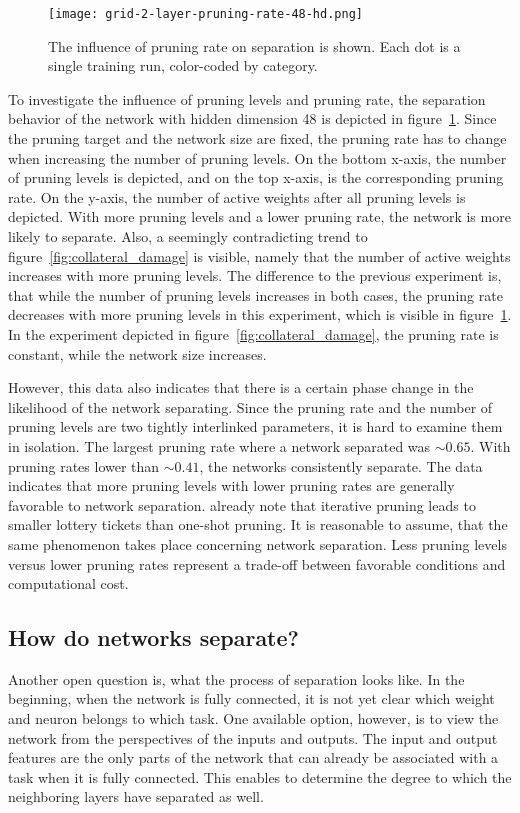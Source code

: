 \begin{figure}[ht] %
    \centering
    \texttt{[image: grid-2-layer-pruning-rate-48-hd.png]}
    \caption[Influence of pruning rate on separation]{
        The influence of pruning rate on separation is shown.
        Each dot is a single training run, color-coded by category.
    }\label{fig:grid-2}
\end{figure}

To investigate the influence of pruning levels and pruning rate, the separation behavior of the network with hidden dimension 48 is depicted in figure~\ref{fig:grid-2}.
Since the pruning target and the network size are fixed, the pruning rate has to change when increasing the number of pruning levels.
On the bottom x-axis, the number of pruning levels is depicted, and on the top x-axis, is the corresponding pruning rate.
On the y-axis, the number of active weights after all pruning levels is depicted.
With more pruning levels and a lower pruning rate, the network is more likely to separate.
Also, a seemingly contradicting trend to figure~\ref{fig:collateral_damage} is visible, namely that the number of active weights increases with more pruning levels.
The difference to the previous experiment is, that while the number of pruning levels increases in both cases, the pruning rate decreases with more pruning levels in this experiment, which is visible in figure~\ref{fig:grid-2}. In the experiment depicted in figure~\ref{fig:collateral_damage}, the pruning rate is constant, while the network size increases.

However, this data also indicates that there is a certain phase change in the likelihood of the network separating.
Since the pruning rate and the number of pruning levels are two tightly interlinked parameters, it is hard to examine them in isolation.
The largest pruning rate where a network separated was $\sim0.65$. 
With pruning rates lower than $\sim0.41$, the networks consistently separate.
The data indicates that more pruning levels with lower pruning rates are generally favorable to network separation.
\textcite{LTH} already note that iterative pruning leads to smaller lottery tickets than one-shot pruning.
It is reasonable to assume, that the same phenomenon takes place concerning network separation.
Less pruning levels versus lower pruning rates represent a trade-off between favorable conditions and computational cost.

\subsection{How do networks separate?}
Another open question is, what the process of separation looks like.
In the beginning, when the network is fully connected, it is not yet clear which weight and neuron belongs to which task.
One available option, however, is to view the network from the perspectives of the inputs and outputs.
The input and output features are the only parts of the network that can already be associated with a task when it is fully connected.
This enables to determine the degree to which the neighboring layers have separated as well.

